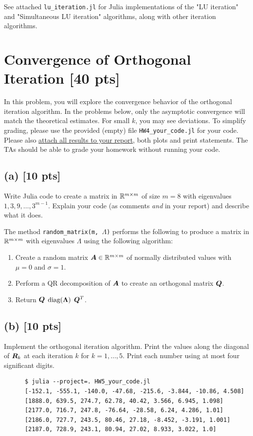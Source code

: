 \documentclass[twoside,10pt]{article}
\begin{document}
See attached \verb|lu_iteration.jl| for Julia implementations of the "LU iteration" and "Simultaneous LU iteration" algorithms, along with other iteration algorithms.

\section{Convergence of Orthogonal Iteration [40 pts]}
  In this problem, you will explore the convergence behavior of the orthogonal iteration algorithm. In the problems below, only the asymptotic convergence will match the theoretical estimates. 
  For small $k$, you may see deviations.
  To simplify grading, please use the provided (empty) file \texttt{HW4\_your\_code.jl} for your code. 
  Please also \underline{attach all results to your report}, both plots and print statements. 
  The TAs should be able to grade your homework without running your code. 
  \subsection*{(a) [10 pts]} 
    Write Julia code to create a matrix in $\mathbb{R}^{m \times m}$ of size $m = 8$ with eigenvalues $1, 3, 9, \ldots, 3^{m -1}$. 
    Explain your code (as comments \emph{and} in your report) and describe what it does.

    The method \verb|random_matrix(m, |$\Lambda$\verb|)| performs the following to produce a matrix in $\mathbb{R}^{m \times m}$ with eigenvalues $\Lambda$ using the following algorithm:
    \begin{enumerate}
      \item Create a random matrix $\bm{A} \in \mathbb{R}^{m \times m}$ of normally distributed values with $\mu = 0$ and $\sigma = 1$.
      \item Perform a QR decomposition of $\bm{A}$ to create an orthogonal matrix $\bm{Q}$.
      \item Return $\bm{Q}$ $\text{diag}(\bm{\Lambda})$ $\bm{Q}^T$.
    \end{enumerate}

  \subsection*{(b) [10 pts]}
    Implement the orthogonal iteration algorithm. Print the values along the diagonal of $\bm{R}_{k}$ at each iteration $k$ for $k = 1, \ldots,5$. Print each number using at most four significant digits.
    
    \begin{verbatim}
      $ julia --project=. HW5_your_code.jl
      [-152.1, -555.1, -140.0, -47.68, -215.6, -3.844, -10.86, 4.508]
      [1888.0, 639.5, 274.7, 62.78, 40.42, 3.566, 6.945, 1.098]
      [2177.0, 716.7, 247.8, -76.64, -28.58, 6.24, 4.286, 1.01]
      [2186.0, 727.7, 243.5, 80.46, 27.18, -8.452, -3.191, 1.001]
      [2187.0, 728.9, 243.1, 80.94, 27.02, 8.933, 3.022, 1.0]
    \end{verbatim}
\end{document}
